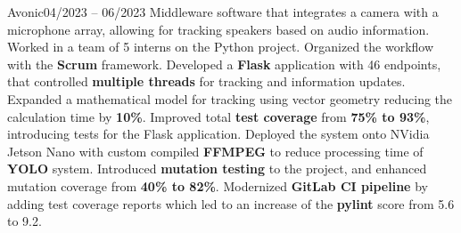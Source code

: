     {Avonic}{04/2023 -- 06/2023}
    \small{\newline{} Middleware software that integrates a camera with a microphone array, allowing for tracking speakers based on audio information.}
    \vspace{-4pt}
    \resumeItemListStart
        \subItemOfItem
            {Worked in a team of 5 interns on the Python project. Organized the workflow with the \textbf{Scrum} framework.}
         \subItemOfItem
            {Developed a \textbf{Flask} application with 46 endpoints, that controlled \textbf{multiple threads} for tracking and information updates.}
        \subItemOfItem
            {Expanded a mathematical model for tracking using vector geometry reducing the calculation time by \textbf{10\%}.}
        \subItemOfItem
            {Improved total \textbf{test coverage} from \textbf{75\% to 93\%}, introducing tests for the Flask application.}
        \subItemOfItem
            {Deployed the system onto NVidia Jetson Nano with custom compiled \textbf{FFMPEG} to reduce processing time of \textbf{YOLO} system.}
        \subItemOfItem
            {Introduced \textbf{mutation testing} to the project, and enhanced mutation coverage from \textbf{40\% to 82\%}.}
        \subItemOfItem
            {Modernized \textbf{GitLab CI pipeline} by adding test coverage reports which led to an increase of the \textbf{pylint} score from 5.6 to 9.2.}
      \resumeItemListEnd